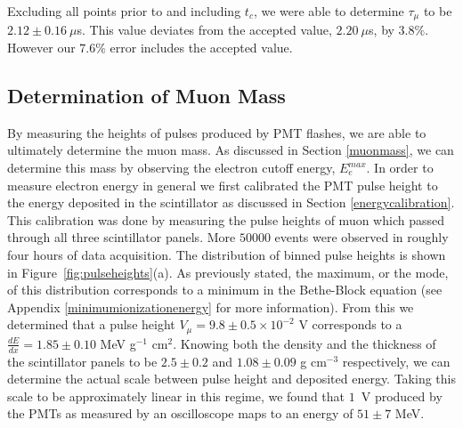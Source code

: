 Excluding all points prior to and including $t_{c}$, we were able to determine $\tau_{\mu}$ to be $2.12 \pm 0.16~\mu$s.  This value deviates from the accepted value, $2.20~\mu$s, by $3.8\%$.  However our $7.6\%$ error includes the accepted value.






\subsection{Determination of Muon Mass}\label{determinationofmuonmass}

By measuring the heights of pulses produced by PMT flashes, we are
able to ultimately determine the muon mass.  As discussed in Section
\ref{muonmass}, we can determine this mass by observing the electron cutoff energy, $E_{e}^{max}$. In order to measure electron energy in general
we first calibrated the PMT pulse height to the energy deposited in
the scintillator as discussed in Section \ref{energycalibration}. This calibration
was done by measuring the pulse heights of muon which passed through
all three scintillator panels.  More $50000$ events were observed in
roughly four hours of data acquisition.  The distribution of binned
pulse heights is shown in Figure~\ref{fig:pulseheights}(a).  As previously stated, the
maximum, or the mode, of this distribution corresponds to a minimum in
the Bethe-Block equation (see Appendix \ref{minimumionizationenergy} for more information).  From this we determined that a pulse
height $V_{\mu} = 9.8\pm0.5 \times 10^{-2}$ V corresponds to a $\frac{dE}{dx}= 1.85\pm0.10$ MeV
g$^{-1}$ cm$^{2}$.  Knowing both the density and the thickness of the
scintillator panels to be $2.5\pm0.2$ and $1.08\pm0.09$ g cm$^{-3}$ respectively, we can determine
the actual scale between pulse height and deposited energy.  Taking
this scale to be approximately linear in this regime, we found that
$1$~V produced by the PMTs as measured by an oscilloscope maps to an
energy of $51 \pm 7$ MeV.



